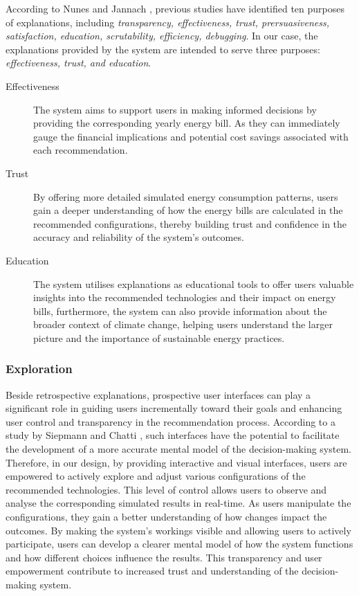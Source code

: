According to Nunes and Jannach \cite{Nunes2020}, previous studies have identified ten purposes of explanations, including 
\emph{transparency, effectiveness, trust, prersuasiveness, satisfaction, education, scrutability, efficiency, debugging}.
In our case, the explanations provided by the system are intended to serve three purposes: 
\emph{effectiveness, trust, and education}. 
\begin{description}
  \item[Effectiveness] The system aims to support users in making informed decisions by providing the corresponding yearly energy bill. 
    As they can immediately gauge the financial implications and potential cost savings associated with each recommendation. 
  \item[Trust] By offering more detailed simulated energy consumption patterns, users gain a deeper understanding of how the energy bills are calculated in the recommended configurations, 
    thereby building trust and confidence in the accuracy and reliability of the system's outcomes.
  \item[Education] The system utilises explanations as educational tools to offer users valuable insights into the recommended technologies and their impact on energy bills, 
    furthermore, the system can also provide information about the broader context of climate change, helping users understand the larger picture and the importance of sustainable energy practices.
\end{description}


\subsubsection{Exploration}

Beside retrospective explanations, prospective user interfaces can play a significant role in guiding users incrementally toward their goals and enhancing user control and transparency in the recommendation process. 
According to a study by Siepmann and Chatti \cite{Siepmann2023}, such interfaces have the potential to facilitate the development of a more accurate mental model of the decision-making system.
Therefore, in our design, by providing interactive and visual interfaces, users are empowered to actively explore and adjust various configurations of the recommended technologies. 
This level of control allows users to observe and analyse the corresponding simulated results in real-time. 
As users manipulate the configurations, they gain a better understanding of how changes impact the outcomes. 
By making the system's workings visible and allowing users to actively participate, users can develop a clearer mental model of how the system functions and how different choices influence the results. 
This transparency and user empowerment contribute to increased trust and understanding of the decision-making system.


